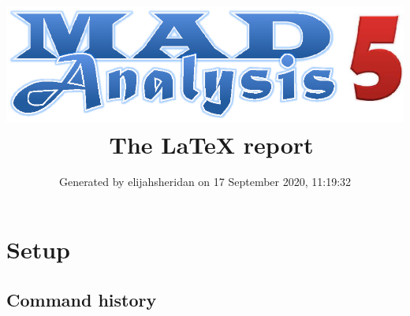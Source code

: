 \documentclass[a4paper, 10pt]{article}
\title{{\includegraphics[scale=.4]{logo.eps}}\ The LaTeX report}
\author{Generated by elijahsheridan on 17 September 2020, 11:19:32}
\begin{document}
\maketitle
\flushbottom

\newpage
\section{ Setup}

\subsection{ Command history}
\end{document}
